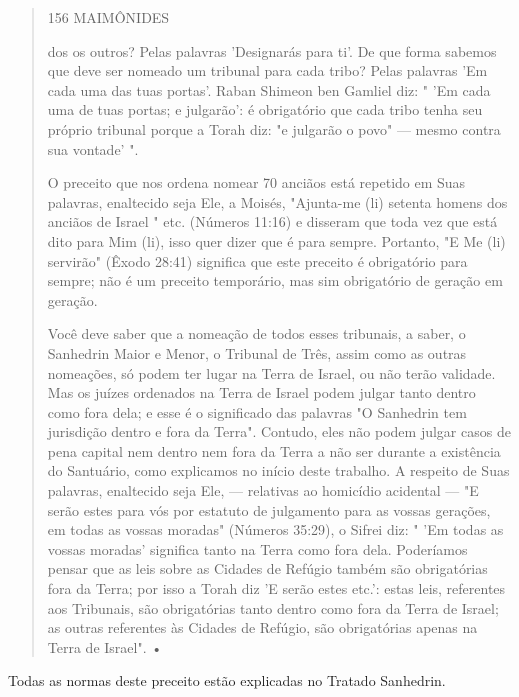 \begin{quote}
156 MAIMÔNIDES

dos os outros? Pelas palavras 'Designarás para ti'. De que forma sabemos
que deve ser nomeado um tribunal para cada tribo? Pelas palavras 'Em
cada uma das tuas portas'. Raban Shimeon ben Gamliel diz: " 'Em cada uma
de tuas por­tas; e julgarão': é obrigatório que cada tribo tenha seu
próprio tribunal porque a Torah diz: "e julgarão o povo" --- mesmo
contra sua vontade' ".

O preceito que nos ordena nomear 70 anciãos está repetido em Suas
palavras, enaltecido seja Ele, a Moisés, "Ajunta-me (li) setenta homens
dos an­ciãos de Israel " etc. (Números 11:16) e disseram que toda vez
que está dito para Mim (li), isso quer dizer que é para sempre.
Portanto, "E Me (li) servirão" (Êxodo 28:41) significa que este preceito
é obrigatório para sempre; não é um preceito temporário, mas sim
obrigatório de geração em geração.

Você deve saber que a nomeação de todos esses tribunais, a saber, o
Sanhedrin Maior e Menor, o Tribunal de Três, assim como as outras
nomea­ções, só podem ter lugar na Terra de Israel, ou não terão
validade. Mas os juízes ordenados na Terra de Israel podem julgar tanto
dentro como fora dela; e esse é o significado das palavras "O Sanhedrin
tem jurisdição dentro e fora da Ter­ra". Contudo, eles não podem julgar
casos de pena capital nem dentro nem fora da Terra a não ser durante a
existência do Santuário, como explicamos no início deste trabalho. A
respeito de Suas palavras, enaltecido seja Ele, --- relati­vas ao
homicídio acidental --- "E serão estes para vós por estatuto de
julgamen­to para as vossas gerações, em todas as vossas moradas"
(Números 35:29), o Sifrei diz: " 'Em todas as vossas moradas' significa
tanto na Terra como fora dela. Poderíamos pensar que as leis sobre as
Cidades de Refúgio também são obrigatórias fora da Terra; por isso a
Torah diz 'E serão estes etc.': estas leis, referentes aos Tribunais,
são obrigatórias tanto dentro como fora da Terra de Israel; as outras
referentes às Cidades de Refúgio, são obrigatórias apenas na Terra de
Israel". •
\end{quote}

Todas as normas deste preceito estão explicadas no Tratado Sanhedrin.

